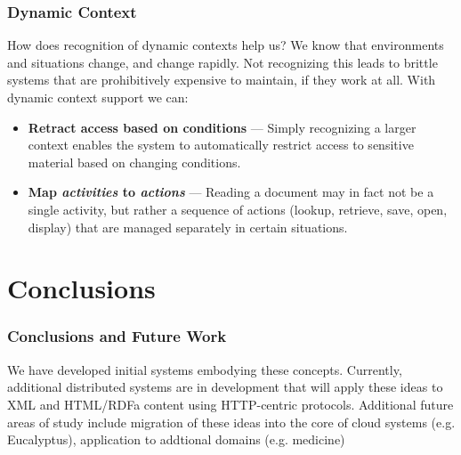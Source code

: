 \documentclass[t,handout, 10pt]{beamer}
\begin{document}
\begin{frame}
\frametitle{Dynamic Context}
How does recognition of dynamic contexts help us?
\newline
\newline
\pause
We know that environments and situations change, and change rapidly.  Not recognizing this leads to brittle systems that are prohibitively expensive to maintain, if they work at all.
\newline
\newline
\pause
With dynamic context support we can:
\begin{itemize}
\item \textbf{Retract access based on conditions} --- Simply recognizing a larger context enables the system to automatically restrict access to sensitive material based on changing conditions.
\pause
\item\textbf{Map \textit{activities} to \textit{actions}} --- Reading a document may in fact not be a single activity, but rather a sequence of actions (lookup, retrieve, save, open, display) that are managed separately in certain situations.
\end{itemize}
\end{frame}

\section{Conclusions}

\begin{frame}
\frametitle{Conclusions and Future Work}
We have developed initial systems embodying these concepts.
\newline
\newline
\pause
Currently, additional distributed systems are in development that will apply these ideas to XML and HTML/RDFa content using HTTP-centric protocols.
\newline
\newline
\pause
Additional future areas of study include migration of these ideas into the core of cloud systems (e.g. Eucalyptus), application to addtional domains (e.g. medicine)
\end{frame}
\end{document}
